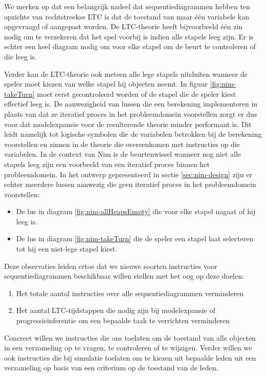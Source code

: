 We merken op dat een belangrijk nadeel dat sequentiediagrammen hebben ten opzichte van rechtstreekse LTC is dat de toestand van maar \'e\'en variabele kan opgevraagd of aangepast worden. De LTC-theorie heeft bijvoorbeeld \'e\'en zin nodig om te verzekeren dat het spel voorbij is indien alle stapels leeg zijn. Er is echter een heel diagram nodig om voor elke stapel om de beurt te controleren of die leeg is.

Verder kan de LTC-theorie ook meteen alle lege stapels uitsluiten wanneer de speler moet kiezen van welke stapel hij objecten neemt. In figuur \ref{fig:nim-takeTurn} moet eerst gecontroleerd worden of de stapel die de speler kiest effectief leeg is. De aanwezigheid van lussen die een berekening implementeren in plaats van dat ze iteratief proces in het probleemdomein voorstellen zorgt er dus voor dat modelexpansie voor de resulterende theorie minder performant is. Dit leidt namelijk tot logische symbolen die de variabelen betrokken bij de berekening voorstellen en zinnen in de theorie die overeenkomen met instructies op die variabelen. In de context van Nim is de beurtenwissel wanneer nog niet alle stapels leeg zijn een voorbeeld van een iteratief proces binnen het probleemdomein. In het ontwerp gepresenteerd in sectie \ref{sec:nim-design} zijn er echter meerdere lussen aanwezig die geen iteratief proces in het probleemdomein voorstellen:

\begin{itemize}
	\item De lus in diagram \ref{fig:nim-allHeapsEmpty} die voor elke stapel nagaat of hij leeg is.
	\item De lus in diagram \ref{fig:nim-takeTurn} die de speler een stapel laat selecteren tot hij een niet-lege stapel kiest.
\end{itemize}

Deze observaties leiden ertoe dat we nieuwe soorten instructies voor sequentiediagrammen beschikbaar willen stellen met het oog op deze doelen:

\begin{enumerate}
	\item Het totale aantal instructies over alle sequentiediagrammen verminderen
	\item Het aantal LTC-tijdstappen die nodig zijn bij modelexpansie of progressie\"inferentie om een bepaalde taak te verrichten verminderen
\end{enumerate}

Concreet willen we instructies die ons toelaten om de toestand van alle objecten in een verzameling op te vragen, te controleren of te wijzigen. Verder willen we ook instructies die bij simulatie toelaten om te kiezen uit bepaalde leden uit een verzameling op basis van een criterium op de toestand van de leden.

